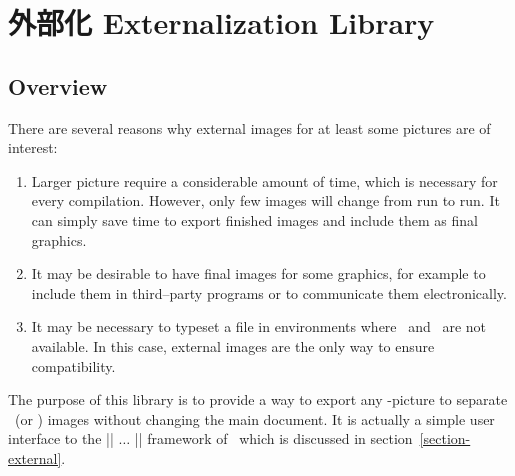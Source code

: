 %
%
%


\section{外部化 Externalization Library}
\label{section-libs-external}

{
{}



\subsection{Overview}

There are several reasons why external images for at least some pictures are of
interest:
%
\begin{enumerate}
    \item Larger picture require a considerable amount of time, which is
        necessary for every compilation. However, only few images will change
        from run to run. It can simply save time to export finished images and
        include them as final graphics.
    \item It may be desirable to have final images for some graphics, for
        example to include them in third--party programs or to communicate them
        electronically.
    \item It may be necessary to typeset a file in environments where \pgfname\
        and \tikzname\ are not available. In this case, external images are the
        only way to ensure compatibility.
\end{enumerate}
%
The purpose of this library is to provide a way to export any \tikzname-picture
to separate \pdf\ (or \eps) images without changing the main document. It is
actually a simple user interface to the |\beginpgfgraphicnamed| $\dotsc$
|\endpgfgraphicnamed| framework of \pgfname\ which is discussed in
section~\ref{section-external}.


}
